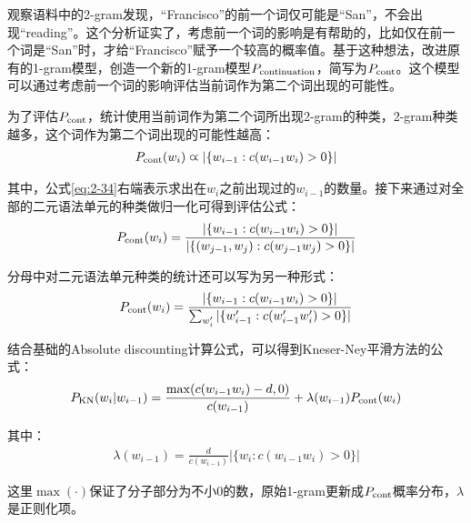 \parinterval 观察语料中的2-gram发现，“Francisco”的前一个词仅可能是“San”，不会出现“reading”。这个分析证实了，考虑前一个词的影响是有帮助的，比如仅在前一个词是“San”时，才给“Francisco”赋予一个较高的概率值。基于这种想法，改进原有的1-gram模型，创造一个新的1-gram模型${P}_{\textrm{continuation}}$，简写为${P}_{\textrm{cont}}$。这个模型可以通过考虑前一个词的影响评估当前词作为第二个词出现的可能性。

\parinterval 为了评估${P}_{\textrm{cont}}$，统计使用当前词作为第二个词所出现2-gram的种类，2-gram种类越多，这个词作为第二个词出现的可能性越高：
\begin{eqnarray}
{P}_{\textrm{cont}}(w_i) \varpropto |\{w_{i-1}: c(w_{i-1} w_i )>0\}|
\label{eq:2-34}
\end{eqnarray}

其中，公式\eqref{eq:2-34}右端表示求出在$w_i$之前出现过的$w_{i-1}$的数量。接下来通过对全部的二元语法单元的种类做归一化可得到评估公式：
\begin{eqnarray}
{P}_{\textrm{cont}}(w_i) = \frac{|\{ w_{i-1}:c(w_{i-1} w_i )>0 \}|}{|\{ (w_{j-1},w_j):c(w_{j-1} w_j )>0 \}|}
\label{eq:2-35}
\end{eqnarray}

\parinterval 分母中对二元语法单元种类的统计还可以写为另一种形式：
\begin{eqnarray}
{P}_{\textrm{cont}}(w_i) = \frac{|\{ w_{i-1}:c(w_{i-1} w_i )>0 \}|}{\sum_{w^{\prime}_{i}}|\{ w_{i-1}^{\prime}:c(w_{i-1}^{\prime} w_i^{\prime} )>0 \}|}
\label{eq:2-36}
\end{eqnarray}

\parinterval 结合基础的Absolute discounting计算公式，可以得到Kneser-Ney平滑方法的公式：
\begin{eqnarray}
{P}_{\textrm{KN}}(w_i|w_{i-1}) = \frac{\max(c(w_{i-1} w_i )-d,0)}{c(w_{i-1})}+ \lambda(w_{i-1}){P}_{\textrm{cont}}(w_i)
\label{eq:2-37}
\end{eqnarray}

\noindent 其中：
\begin{eqnarray}
\lambda(w_{i-1}) = \frac{d}{c(w_{i-1})}|\{w_i:c(w_{i-1} w_i)>0\}|
\label{eq:2-38}
\end{eqnarray}

\noindent 这里$\max(\cdot)$保证了分子部分为不小0的数，原始1-gram更新成${P}_{\textrm{cont}}$概率分布，$\lambda$是正则化项。

